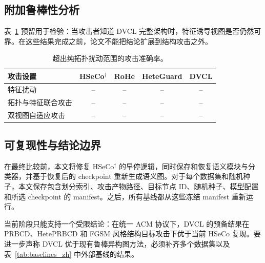 \FloatBarrier
\subsection{附加鲁棒性分析}

表~\ref{tab:adaptive_attack_zh} 预留用于检验：当攻击者知道 DVCL 完整架构时，特征诱导视图是否仍然可靠。在这些结果完成之前，论文不能把结论扩展到结构攻击之外。

\begin{table}[htbp]
\centering
\small
\caption{超出纯拓扑扰动范围的攻击准确率。}
\label{tab:adaptive_attack_zh}
\begin{tabular}{lcccc}
\toprule
攻击设置 & HSeCo$^{\dagger}$ & RoHe & HeteGuard & DVCL \\
\midrule
特征扰动 & -- & -- & -- & -- \\
拓扑与特征联合攻击 & -- & -- & -- & -- \\
双视图自适应攻击 & -- & -- & -- & -- \\
\bottomrule
\end{tabular}
\end{table}

\FloatBarrier
\subsection{可复现性与结论边界}

在最终比较前，本文将修复 HSeCo$^{\dagger}$ 的早停逻辑，同时保存和恢复语义模块与分类器，并基于恢复后的 checkpoint 重新生成语义图。对于每个数据集和随机种子，本文保存包含划分索引、攻击产物路径、目标节点 ID、随机种子、模型配置和所选 checkpoint 的 manifest。之后，所有基线都从这些冻结 manifest 重新运行。

当前阶段只能支持一个受限结论：在统一 ACM 协议下，DVCL 的预备结果在 PRBCD、HetePRBCD 和 FGSM 风格结构目标攻击下优于当前 HSeCo 复现。要进一步声称 DVCL 优于现有鲁棒异构图方法，必须补齐多个数据集以及表~\ref{tab:baselines_zh} 中外部基线的结果。

\FloatBarrier
